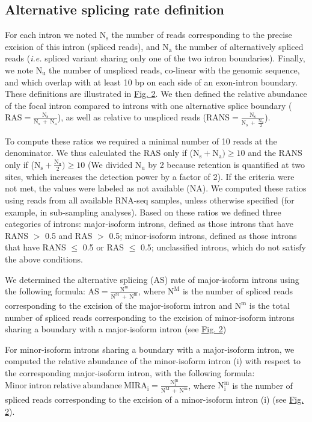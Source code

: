 \subsection{Alternative splicing rate definition}
For each intron we noted $\mathrm{N_s}$ the number of reads corresponding to the precise excision of this intron (spliced reads), and $\mathrm{N_a}$ the number of alternatively spliced reads (\textit{i.e.} spliced variant sharing only one of the two intron boundaries). Finally, we note $\mathrm{N_u}$ the number of unspliced reads, co-linear with the genomic sequence, and which overlap with at least 10 bp on each side of an exon-intron boundary. These definitions are illustrated in \hyperref[fig:AS2]{Fig. 2}. We then defined the relative abundance of the focal intron compared to introns with one alternative splice boundary ($\mathrm{RAS=\frac{N_s}{N_s~+~{N_a}}}$), as well as relative to unspliced reads ($\mathrm{RANS=\frac{N_s}{N_s~+~\frac{N_u}{2}}}$).

To compute these ratios we required a minimal number of 10 reads at the denominator. We thus calculated the RAS only if ($\mathrm{N_s+N_a})\geq10$ and the RANS only if ($\mathrm{N_s+\frac{N_u}{2}})\geq10$ (We divided $\mathrm{N_u}$ by 2 because retention is quantified at two sites, which increases the detection power by a factor of 2). If the criteria were not met, the values were labeled as not available (NA). We computed these ratios using reads from all available RNA-seq samples, unless otherwise specified (for example, in sub-sampling analyses). Based on these ratios we defined three categories of introns:
major-isoform introns, defined as those introns that have RANS $>$ 0.5 and RAS $>$ 0.5;
minor-isoform introns, defined as those introns that have RANS $\leq$ 0.5 or RAS $\leq$ 0.5;
unclassified introns, which do not satisfy the above conditions.

We determined the alternative splicing (AS) rate of major-isoform introns using the following formula: $\mathrm{AS=\frac{N^m}{N^M~+~N^m}}$, where $\mathrm{N^M}$ is the number of spliced reads corresponding to the excision of the major-isoform intron and $\mathrm{N^m}$ is the total number of spliced reads corresponding to the excision of minor-isoform introns sharing a boundary with a major-isoform intron (see \hyperref[fig:AS2]{Fig. 2})

For minor-isoform introns sharing a boundary with a major-isoform intron, we computed the relative abundance of the minor-isoform intron (i) with respect to the corresponding major-isoform intron, with the following formula:\\
$\mathrm{Minor~intron~relative~abundance~MIRA_i=\frac{N_i^m}{N^M~+~N^m}}$, where $\mathrm{N_i^m}$ is the number of spliced reads corresponding to the excision of a minor-isoform intron (i) (see \hyperref[fig:AS2]{Fig. 2}).


